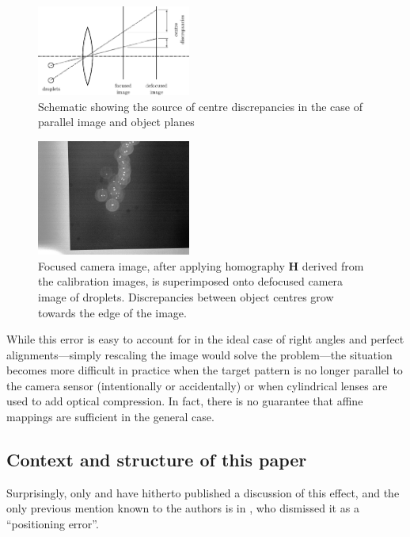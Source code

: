 \documentclass[floatfix,aip,rsi,reprint,graphicx]{revtex4-1}
\begin{document}
\begin{figure}
\centering
\includegraphics[width=0.45\textwidth]{orb_images/discrepancy.eps}
\caption{Schematic showing the source of centre discrepancies in the case of
parallel image and object planes \label{fig:discrepancy}}
\end{figure}
\begin{figure}
    \centering
    \includegraphics[width=0.45\textwidth]{orb_images/drop-calibration-off.jpg}
    \caption{Focused camera image, after applying homography $\mathbf{H}$
        derived from the calibration images, is superimposed onto
    defocused camera image of droplets. Discrepancies between object centres
grow towards the edge of the image.}
    \label{fig:drop-calibration-off}
\end{figure}
While this error is easy to account for in the ideal case of right angles and
perfect alignments---simply rescaling the image would solve the problem---the
situation becomes more difficult in practice when the target pattern is no longer
parallel to the camera sensor (intentionally or accidentally) or when
cylindrical lenses are used to add optical compression. In fact, there is no
guarantee that affine mappings are sufficient in the general case.

\subsection{Context and structure of this paper}
Surprisingly, only \citet{Hardalupas10a} and \citet{Hardalupas10} have hitherto published a discussion of
this effect, and the only previous mention known to the authors is in
\citet{Kurosawa02}, who dismissed it as a ``positioning error''.
\end{document}

